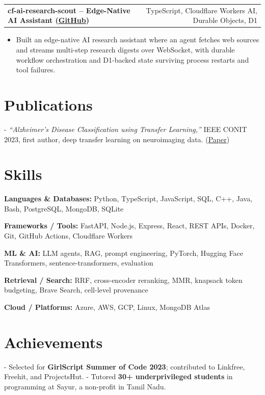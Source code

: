 \documentclass[letterpaper,11pt]{article}
\makeatletter
\newcommand{\projItem}[2]{%
  \vspace{4pt}
  \begin{tabular*}{\textwidth}{@{}l@{\extracolsep{\fill}}r@{}}
    \textbf{#1} & #2 \\
  \end{tabular*}\par\vspace{-2pt}
}
\newcommand{\skillLine}[2]{\textbf{#1:} #2\par\vspace{2pt}}
\newcommand{\inlineBlock}[1]{{\setlength{\leftskip}{0.18in}\small #1\par}}
\makeatother
\begin{document}
\projItem{cf-ai-research-scout -- Edge-Native AI Assistant {\normalfont\small(\href{https://github.com/Deva-1903/cf_ai_research_scout}{GitHub})}}{TypeScript, Cloudflare Workers AI, Durable Objects, D1}
\begin{itemize}
  \item Built an edge-native AI research assistant where an agent fetches web sources and streams multi-step research digests over WebSocket, with durable workflow orchestration and D1-backed state surviving process restarts and tool failures.
\end{itemize}

\section{Publications}
\inlineBlock{- \textit{``Alzheimer's Disease Classification using Transfer Learning,''} IEEE CONIT 2023, first author, deep transfer learning on neuroimaging data. {\normalfont\small(\href{https://ieeexplore.ieee.org/document/10205760}{Paper})}}

\section{Skills}
\skillLine{Languages \& Databases}{Python, TypeScript, JavaScript, SQL, C++, Java, Bash, PostgreSQL, MongoDB, SQLite}
\skillLine{Frameworks / Tools}{FastAPI, Node.js, Express, React, REST APIs, Docker, Git, GitHub Actions, Cloudflare Workers}
\skillLine{ML \& AI}{LLM agents, RAG, prompt engineering, PyTorch, Hugging Face Transformers, sentence-transformers, evaluation}
\skillLine{Retrieval / Search}{RRF, cross-encoder reranking, MMR, knapsack token budgeting, Brave Search, cell-level provenance}
\skillLine{Cloud / Platforms}{Azure, AWS, GCP, Linux, MongoDB Atlas}

\section{Achievements}
\inlineBlock{- Selected for \textbf{GirlScript Summer of Code 2023}; contributed to Linkfree, Freehit, and ProjectsHut. - Tutored \textbf{30+ underprivileged students} in programming at Sayur, a non-profit in Tamil Nadu.}
\end{document}
